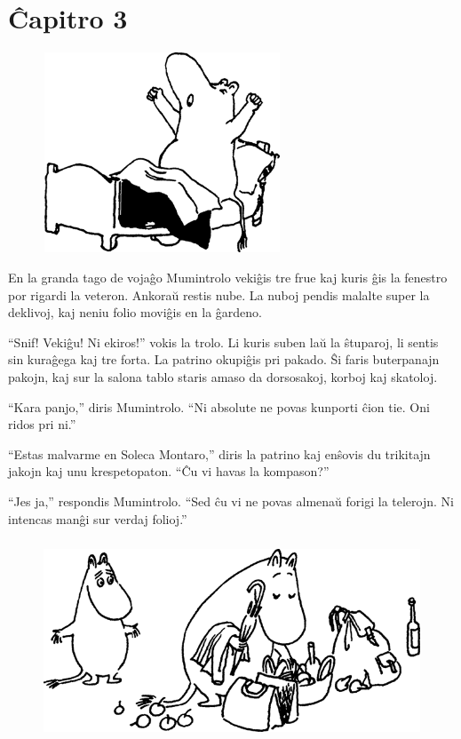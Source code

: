 \chapter[Ĉapitro 3]{Ĉapitro 3}

\begin{figure}[htbp]
\centering
\includegraphics[width=200pt,height=169pt]{3-1.png}
\caption{}
\label{3-1}
\end{figure}

En la granda tago de vojaĝo Mumintrolo vekiĝis tre frue kaj kuris ĝis la fenestro por rigardi la veteron. Ankoraŭ restis nube. La nuboj pendis malalte super la deklivoj, kaj neniu folio moviĝis en la ĝardeno.

``Snif! Vekiĝu! Ni ekiros!'' vokis la trolo. Li kuris suben laŭ la ŝtuparoj, li sentis sin kuraĝega kaj tre forta. La patrino okupiĝis pri pakado. Ŝi faris buterpanajn pakojn, kaj sur la salona tablo staris amaso da dorsosakoj, korboj kaj skatoloj.

``Kara panjo,'' diris Mumintrolo. ``Ni absolute ne povas kunporti ĉion tie. Oni ridos pri ni.''

``Estas malvarme en Soleca Montaro,'' diris la patrino kaj enŝovis du trikitajn jakojn kaj unu krespetopaton. ``Ĉu vi havas la kompason?''

``Jes ja,'' respondis Mumintrolo. ``Sed ĉu vi ne povas almenaŭ forigi la telerojn. Ni intencas manĝi sur verdaj folioj.''

\begin{figure}[htbp]
\centering
\includegraphics[width=350pt,height=169pt]{3-2.png}
\caption{}
\label{3-2}
\end{figure}

